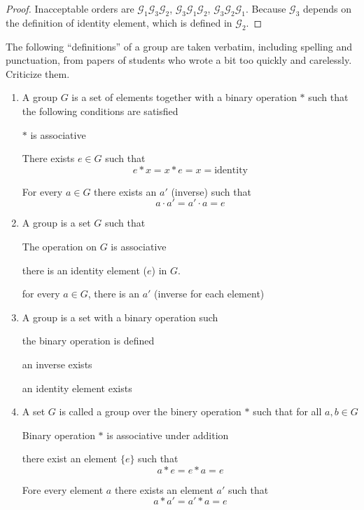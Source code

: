 \begin{proof}
    Inacceptable orders are $\mathscr{G}_{1}\mathscr{G}_{3}\mathscr{G}_{2}$, $\mathscr{G}_{3}\mathscr{G}_{1}\mathscr{G}_{2}$, $\mathscr{G}_{3}\mathscr{G}_{2}\mathscr{G}_{1}$. Because $\mathcal{G}_{3}$ depends on the definition of identity element, which is defined in $\mathcal{G}_{2}$.
\end{proof}

\begin{exercise}
    The following ``definitions'' of a group are taken verbatim, including spelling and punctuation, from papers of students who wrote a bit too quickly and carelessly. Criticize them.
    \begin{enumerate}
        \item A group $G$ is a set of elements together with a binary operation $*$ such that the following conditions are satisfied

              $*$ is associative

              There exists $e\in G$ such that
              \[
                  e * x = x * e = x = \text{identity}
              \]

              For every $a\in G$ there exists an $a'$ (inverse) such that
              \[
                  a\cdot a' = a'\cdot a = e
              \]
        \item A group is a set $G$ such that

              The operation on $G$ is associative

              there is an identity element ($e$) in $G$.

              for every $a\in G$, there is an $a'$ (inverse for each element)
        \item A group is a set with a binary operation such

              the binary operation is defined

              an inverse exists

              an identity element exists
        \item A set $G$ is called a group over the binery operation $*$ such that for all $a, b\in G$

              Binary operation $*$ is associative under addition

              there exist an element $\{e\}$ such that
              \[
                  a * e = e * a = e
              \]

              Fore every element $a$ there exists an element $a'$ such that
              \[
                  a * a' = a' * a = e
              \]
    \end{enumerate}
\end{exercise}

